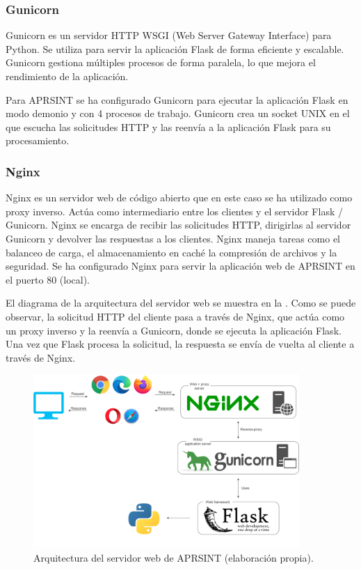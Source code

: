 \subsubsection*{Gunicorn}

Gunicorn es un servidor HTTP WSGI (Web Server Gateway Interface) para Python. Se utiliza para servir la aplicación Flask de forma eficiente y escalable. Gunicorn gestiona múltiples procesos de forma paralela, lo que mejora el rendimiento de la aplicación.

Para APRSINT se ha configurado Gunicorn para ejecutar la aplicación Flask en modo demonio y con 4 procesos de trabajo. Gunicorn crea un socket UNIX en el que escucha las solicitudes HTTP y las reenvía a la aplicación Flask para su procesamiento.

\subsubsection*{Nginx}

Nginx es un servidor web de código abierto que en este caso se ha utilizado como proxy inverso. Actúa como intermediario entre los clientes y el servidor Flask / Gunicorn. Nginx se encarga de recibir las solicitudes HTTP, dirigirlas al servidor Gunicorn y devolver las respuestas a los clientes. Nginx maneja tareas como el balanceo de carga, el almacenamiento en caché la compresión de archivos y la seguridad. Se ha configurado Nginx para servir la aplicación web de APRSINT en el puerto 80 (local).

El diagrama de la arquitectura del servidor web se muestra en la . Como se puede observar, la solicitud HTTP del cliente pasa a través de Nginx, que actúa como un proxy inverso y la reenvía a Gunicorn, donde se ejecuta la aplicación Flask. Una vez que Flask procesa la solicitud, la respuesta se envía de vuelta al cliente a través de Nginx.

\begin{figure}[h]
	\centering
	\includegraphics[width=0.9\textwidth]{Imagenes/Chapter_4/web_server.png}
	\caption[Arquitectura del servidor web de APRSINT.]{Arquitectura del servidor web de APRSINT (elaboración propia).}
	\label{fig:web-server}
\end{figure}


